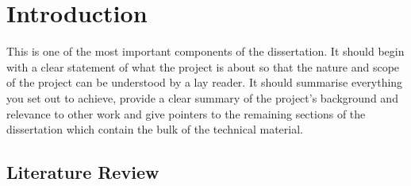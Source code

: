 \chapter{Introduction}
This is one of the most important components of the dissertation. It should begin with a clear statement of what the project is about so that the nature and scope of the project can be understood by a lay reader. It should summarise everything you set out to achieve, provide a clear summary of the project's background and relevance to other work and give pointers to the remaining sections of the dissertation which contain the bulk of the technical material.


\section{Literature Review}
   